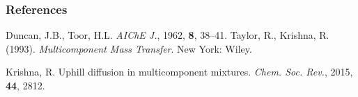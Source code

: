 \documentclass[twocolumn]{article}
\begin{document}
\subsubsection*{References}
\renewcommand{\refname}{}
\begin{thebibliography}{2}
\label{eqn:my_ref_2}
Duncan, J.B., Toor, H.L. \textit{AIChE J.}, 1962, \textbf{8}, 38–41.
\label{eqn:my_ref_1}
Taylor, R., Krishna, R. (1993). \textit{Multicomponent Mass Transfer}. New York: Wiley.

\label{eqn:my_ref_3}
Krishna, R. Uphill diffusion in multicomponent mixtures. \textit{Chem. Soc. Rev.}, 2015, \textbf{44}, 2812.

\end{thebibliography}
\end{document}
